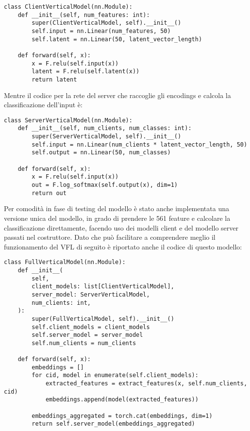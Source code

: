 \begin{lstlisting}
class ClientVerticalModel(nn.Module):
    def __init__(self, num_features: int):
        super(ClientVerticalModel, self).__init__()
        self.input = nn.Linear(num_features, 50)
        self.latent = nn.Linear(50, latent_vector_length)

    def forward(self, x):
        x = F.relu(self.input(x))
        latent = F.relu(self.latent(x))
        return latent
\end{lstlisting}

Mentre il codice per la rete del server che raccoglie gli encodings e 
calcola la classificazione dell'input è:

\begin{lstlisting}
class ServerVerticalModel(nn.Module):
    def __init__(self, num_clients, num_classes: int):
        super(ServerVerticalModel, self).__init__()
        self.input = nn.Linear(num_clients * latent_vector_length, 50)
        self.output = nn.Linear(50, num_classes)

    def forward(self, x):
        x = F.relu(self.input(x))
        out = F.log_softmax(self.output(x), dim=1)
        return out
\end{lstlisting}

Per comodità in fase di testing del modello è stato anche implementata 
una versione unica del modello, in grado di prendere le 561 feature e 
calcolare la classificazione direttamente, facendo uso dei modelli 
client e del modello server passati nel costruttore. Dato che può 
facilitare a comprendere meglio il funzionamento del VFL di seguito è
riportato anche il codice di questo modello:

\begin{lstlisting}
class FullVerticalModel(nn.Module):
    def __init__(
        self,
        client_models: list[ClientVerticalModel],
        server_model: ServerVerticalModel,
        num_clients: int,
    ):
        super(FullVerticalModel, self).__init__()
        self.client_models = client_models
        self.server_model = server_model
        self.num_clients = num_clients

    def forward(self, x):
        embeddings = []
        for cid, model in enumerate(self.client_models):
            extracted_features = extract_features(x, self.num_clients, cid)
            embeddings.append(model(extracted_features))

        embeddings_aggregated = torch.cat(embeddings, dim=1)
        return self.server_model(embeddings_aggregated)
\end{lstlisting}


